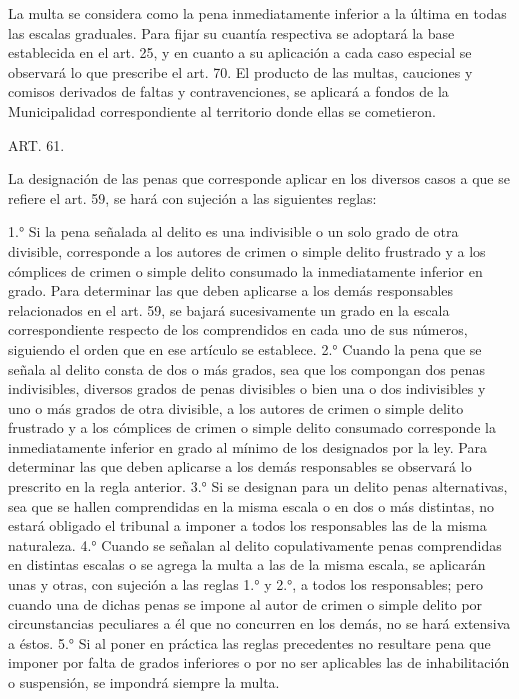     La multa se considera como la pena inmediatamente inferior a la última en todas las escalas graduales.
    Para fijar su cuantía respectiva se adoptará la base establecida en el art. 25, y en cuanto a su aplicación a cada caso especial se observará lo que prescribe el art. 70.
    El producto de las multas, cauciones y comisos derivados de faltas y contravenciones, se aplicará a fondos de la Municipalidad correspondiente al territorio donde ellas se cometieron.


    ART. 61.

    La designación de las penas que corresponde aplicar en los diversos casos a que se refiere el art. 59, se hará con sujeción a las siguientes reglas:

    1.° Si la pena señalada al delito es una indivisible o un solo grado de otra divisible, corresponde a los autores de crimen o simple delito frustrado y a los cómplices de crimen o simple delito consumado la inmediatamente inferior en grado.
    Para determinar las que deben aplicarse a los demás responsables relacionados en el art. 59, se bajará sucesivamente un grado en la escala correspondiente respecto de los comprendidos en cada uno de sus números, siguiendo el orden que en ese artículo se establece.
    2.° Cuando la pena que se señala al delito consta de dos o más grados, sea que los compongan dos penas indivisibles, diversos grados de penas divisibles o bien una o dos indivisibles y uno o más grados de otra divisible, a los autores de crimen o simple delito frustrado y a los cómplices de crimen o simple delito consumado corresponde la inmediatamente inferior en grado al mínimo de los designados por la ley.
    Para determinar las que deben aplicarse a los demás responsables se observará lo prescrito en la regla anterior.
    3.° Si se designan para un delito penas alternativas, sea que se hallen comprendidas en la misma escala o en dos o más distintas, no estará obligado el tribunal a imponer a todos los responsables las de la misma naturaleza.
    4.° Cuando se señalan al delito copulativamente penas comprendidas en distintas escalas o se agrega la multa a las de la misma escala, se aplicarán unas y otras, con sujeción a las reglas 1.° y 2.°, a todos los responsables; pero cuando una de dichas penas se impone al autor de crimen o simple delito por circunstancias peculiares a él que no concurren en los demás, no se hará extensiva a éstos.
    5.°  Si al poner en práctica las reglas precedentes no resultare pena que imponer por falta de grados inferiores o por no ser aplicables las de inhabilitación o suspensión, se impondrá siempre la multa.

